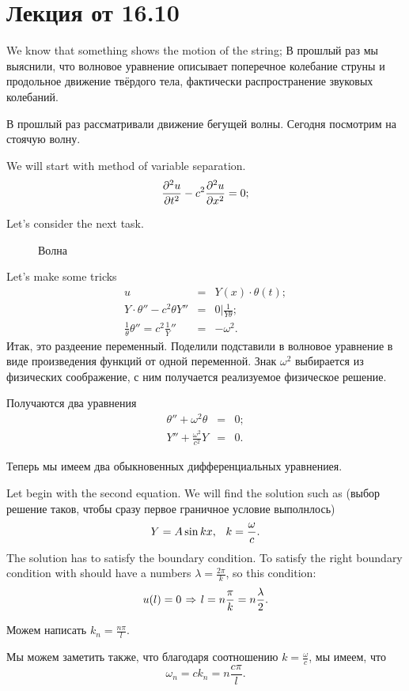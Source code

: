 \section{Лекция от 16.10}

We know that something shows the motion of the string;
В прошлый раз мы выяснили, что волновое уравнение описывает поперечное колебание струны и продольное движение твёрдого тела, фактически распространение звуковых колебаний.

В прошлый раз рассматривали движение бегущей волны. Сегодня посмотрим на стоячую волну.

We will start with method of variable separation.
\[
  \frac{\partial ^2u}{\partial t^2} - c^2 \frac{\partial ^2u}{\partial x^2} = 0;
\]

Let's consider the next task.
\begin{figure}[H]
  \centering
  \caption{Волна}
  \label{fig:wave}
\end{figure}

Let's make some tricks
\begin{eqnarray*}
  u &=&  Y(x) \cdot \theta(t);\\
  Y\cdot \theta'' - c^2 \theta Y'' &=&  0\big| \frac1{Y\theta};\\
  \frac1\theta \theta'' = c^2 \frac 1Y'' &=&  -\omega^2.
\end{eqnarray*}
Итак, это раздеение переменный. Поделили подставили в волновое уравнение в виде произведения функций от одной переменной. Знак $\omega^2$ выбирается из физических соображение, с ним получается реализуемое физическое решение.

Получаются два уравнения
\begin{eqnarray*}
  \theta'' + \omega^2\theta &=&  0;\\
  Y'' + \frac{\omega^2}{c^2} Y &=& 0.
\end{eqnarray*}

Теперь мы имеем два обыкновенных дифференциальных уравнениея.

Let begin with the second equation. We will find the solution such as (выбор решение таков, чтобы сразу первое граничное условие выполнлось)
\[
  Y = A \sin kx,\pau k = \frac\omega c.
\]
The solution has to satisfy the boundary condition. To satisfy the right boundary condition with should have a numbers $\lambda = \frac{2\pi}k$, so this condition:
\[
  u(l) = 0 \imp l = n\frac\pi k = n\frac\lambda2.
\]

Можем написать $k_n = \frac{n\pi}l$.

Мы можем заметить также, что благодаря соотношению $k=\frac\omega c$, мы имеем, что
\[
  \omega_n = c k_n = n\frac{c\pi}l.
\]

